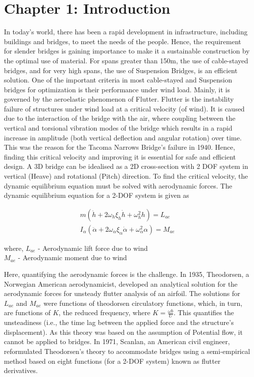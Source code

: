 \documentclass[a4paper, 12pt]{report}
\begin{document}

\section*{Chapter 1:    Introduction}

In today's world, there has been a rapid development in infrastructure, including buildings and bridges, to meet the needs of the 
people. Hence, the requirement for slender bridges is gaining importance to make it a sustainable construction by the optimal use 
of material. For spans greater than 150m, the use of cable-stayed bridges, and for very high spans, the use of Suspension Bridges, 
is an efficient solution. One of the important criteria in most cable-stayed and Suspension bridges for optimization is their 
performance under wind load. Mainly, it is governed by the aeroelastic phenomenon of Flutter. Flutter is the instability failure 
of structures under wind load at a critical velocity (of wind). It is caused due to the interaction of the bridge with the air, 
where coupling between the vertical and torsional vibration modes of the bridge which results in a rapid increase in amplitude 
(both vertical deflection and angular rotation) over time. This was the reason for the Tacoma Narrows Bridge's failure in 1940. 
Hence, finding this critical velocity and improving it is essential for safe and efficient design. A 3D bridge can be idealised 
as a 2D cross-section with 2 DOF system in vertical (Heave) and rotational (Pitch) direction. To find the critical velocity, 
the dynamic equilibrium equation must be solved with aerodynamic forces. The dynamic equilibrium equation for a 2-DOF system is 
given as

\begin{align}
m(\ddot{h} + 2\omega_h\xi_h\dot{h} + \omega_h^2 h) = L_{ae} \\
I_\alpha( \ddot{\alpha} + 2\omega_\alpha\xi_\alpha\dot{\alpha} + \omega_\alpha^2 \alpha) = M_{ae}
\end{align}

where, $L_{ae}$ - Aerodynamic lift force due to wind \\
\phantom{where,} $M_{ae}$ - Aerodynamic moment due to wind
\vspace{0.5 cm}

Here, quantifying the aerodynamic forces is the challenge. In 1935, Theodorsen, a Norwegian American aerodynamicist, developed an 
analytical solution for the aerodynamic forces for unsteady flutter analysis of an airfoil. The solutions for $L_{ae}$ and 
$M_{ae}$ were functions of theodorsen circulatory functions, which, in turn, are functions of $K$, the reduced frequency, where 
$K = \frac{\omega b}{U}$. This quantifies the unsteadiness (i.e., the time lag between the applied force and the structure's 
displacement). As this theory was based on the assumption of Potential flow, it cannot be applied to bridges. In 1971, Scanlan, 
an American civil engineer, reformulated Theodorsen's theory to accommodate bridges using a semi-empirical method based on eight 
functions (for a 2-DOF system) known as flutter derivatives.
\end{document}

